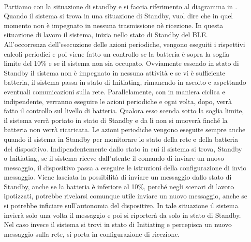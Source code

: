 \\
Partiamo con la situazione di standby e si faccia riferimento al diagramma in . Quando il sistema si trova in una situazione di Standby, vuol dire che in quel momento non è impegnato in nessuna trasmissione nè ricezione. In questa situazione di lavoro il sistema, inizia nello stato di Standby del \acs{BLE}. All'occorrenza dell'esecuzione delle azioni periodiche, vengono eseguiti i rispettivi calcoli periodici e poi viene fatto un controllo se la batteria è sopra la soglia limite del 10\% e se il sistema non sia occupato. Ovviamente essendo in stato di Standby il sistema non è impegnato in nessuna attività e se vi è sufficiente batteria, il sistema passa in stato di Initiating, rimanendo in ascolto e aspettando eventuali comunicazioni sulla rete. Parallelamente, con in maniera ciclica e indipendente, verranno eseguire le azioni periodiche e ogni volta, dopo, verrà fatto il controllo sul livello di batteria. Qualora esso scenda sotto la soglia limite, il sistema verrà portato in stato di Standby e da li non si muoverà finché la batteria non verrà ricaricata. Le azioni periodiche vengono eseguite sempre anche quando il sistema in Standby per monitorare lo stato della rete e della batteria del dispositivo.
Indipendentemente dallo stato in cui il sistema si trova, Standby o Initiating, se il sistema riceve dall'utente il comando di inviare un nuovo messaggio, il dispositivo passa a eseguire le istruzioni della configurazione di invio messaggio. Viene lasciata la possibilità di inviare un messaggio dallo stato di Standby, anche se la batteria è inferiore al 10\%, perché negli scenari di lavoro ipotizzati, potrebbe rivelarsi comunque utile inviare un nuovo messaggio, anche se si potrebbe inficiare sull'autonomia del dispositivo. In tale situazione il sistema invierà solo una volta il messaggio e poi si riporterà da solo in stato di Standby. Nel caso invece il sistema si trovi in stato di Initiating e percepisca un nuovo messaggio sulla rete, si porta in configurazione di ricezione.
\bigskip

